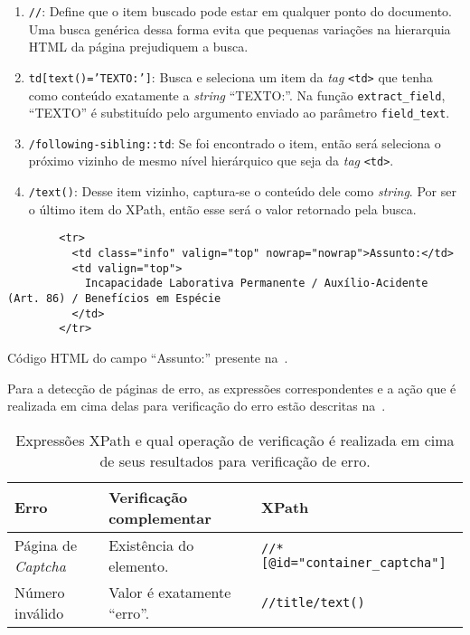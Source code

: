 \begin{enumerate}
    \item \texttt{//}: Define que o item buscado pode estar em qualquer ponto
        do documento. Uma busca genérica dessa forma evita que pequenas
        variações na hierarquia HTML da página prejudiquem a busca.
    \item \texttt{td[text()='TEXTO:']}: Busca e seleciona um item da
        \textit{tag} \texttt{<td>} que tenha como conteúdo exatamente a
        \textit{string} ``TEXTO:''. Na função \texttt{extract\_field},
        ``TEXTO'' é substituído pelo argumento enviado ao parâmetro
        \texttt{field\_text}.
    \item \texttt{/following-sibling::td}: Se foi encontrado o item, então será
        seleciona o próximo vizinho de mesmo nível hierárquico que seja da
        \textit{tag} \texttt{<td>}.
    \item \texttt{/text()}: Desse item vizinho, captura-se o conteúdo dele como
        \textit{string}. Por ser o último item do XPath, então esse será o
        valor retornado pela busca.
\end{enumerate}


\begin{listing}
    \centering{}
    \begin{verbatim}
        <tr>
          <td class="info" valign="top" nowrap="nowrap">Assunto:</td>
          <td valign="top">
            Incapacidade Laborativa Permanente / Auxílio-Acidente (Art. 86) / Benefícios em Espécie
          </td>
        </tr>
    \end{verbatim}
    \caption{Código HTML do campo ``Assunto:'' presente na~.}
    \label{cod:html-assunto}
\end{listing}


Para a detecção de páginas de erro, as expressões correspondentes e a ação que
é realizada em cima delas para verificação do erro estão descritas
na~.

\begin{table}[htb]
    \begin{tabular}{lll}
        \toprule
        Erro & Verificação complementar & XPath \\
        \midrule
        Página de \textit{Captcha} & Existência do elemento. & \texttt{//*[@id="container_captcha"]} \\
        Número inválido & Valor é exatamente ``erro''. & \texttt{//title/text()} \\
        \bottomrule
    \end{tabular}
    \caption{%
        Expressões XPath e qual operação de verificação é realizada em cima de
        seus resultados para verificação de erro.
    }
    \label{tbl:xpaths-de-erros}
\end{table}


